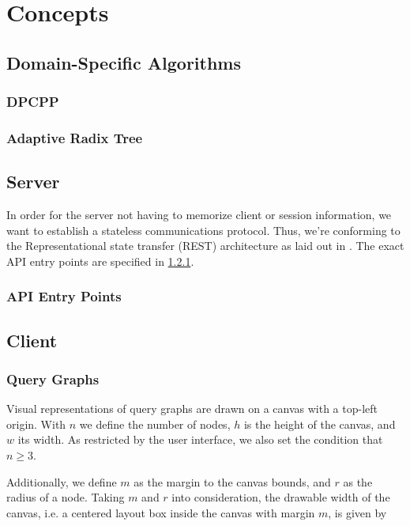 \section{Concepts}

\subsection{Domain-Specific Algorithms}

\subsubsection{DPCPP}

\subsubsection{Adaptive Radix Tree}

\subsection{Server}

In order for the server not having to memorize client or session information, we want to establish a stateless communications protocol.
Thus, we're conforming to the Representational state transfer (REST) architecture as laid out in \cite{fielding2000architectural}.
The exact API entry points are specified in \ref{sub:api-entry-points}.

\subsubsection{API Entry Points}
\label{sub:api-entry-points}

\subsection{Client}

\subsubsection{Query Graphs}

Visual representations of query graphs are drawn on a canvas with a top-left origin.
With $n$ we define the number of nodes, $h$ is the height of the canvas, and $w$ its width. 
As restricted by the user interface, we also set the condition that $n \geq 3$.

Additionally, we define $m$ as the margin to the canvas bounds, and $r$ as the radius of a node.
Taking $m$ and $r$ into consideration, the drawable width of the canvas, i.e. a centered layout box inside the canvas with margin $m$, is given by 

